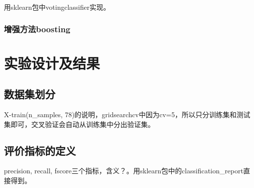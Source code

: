 \documentclass[UTF8]{ctexart}
\begin{document}
用sklearn包中votingclassifier实现。

\subsubsection{增强方法boosting}



\section{实验设计及结果}

\subsection{数据集划分}
X-train(n\_samples, 78)的说明，gridsearchcv中因为cv=5，所以只分训练集和测试集即可，交叉验证会自动从训练集中分出验证集。

\subsection{评价指标的定义}
precision, recall, fscore三个指标，含义？。用sklearn包中的classification\_report直接得到。
\end{document}
